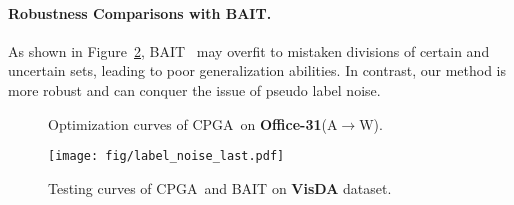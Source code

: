 \documentclass{article}
\def\ournet{CPGA}
\begin{document}
\paragraph{Robustness Comparisons with BAIT.} 
As shown in Figure~\ref{fig:noise}, BAIT~\cite{Yang2020UnsupervisedDA} may overfit to mistaken divisions of certain and uncertain sets, leading to poor generalization abilities.
In contrast, our method is more robust and can conquer the issue of pseudo label noise.

\begin{figure}[!h] 
\vspace{-0.1in}
\centering
\begin{minipage}{0.49\linewidth}
\end{minipage}
\begin{minipage}{0.49\linewidth}
\end{minipage}
\label{figdata}
\vspace{-0.1in}
\caption{Optimization curves of \ournet~on \textbf{Office-31}(A$\rightarrow$W).}
\label{vis:curve2}
\vspace{-0.05in}
\end{figure}


\begin{figure}[!h]
		\begin{center}
		\texttt{[image: fig/label\_noise\_last.pdf]}
		\vspace{-0.1in}
		\caption{Testing curves of \ournet~and BAIT on \textbf{VisDA} dataset.}
		\label{fig:noise}
		\end{center}
\vspace{-0.2in}
\end{figure}
\end{document}

